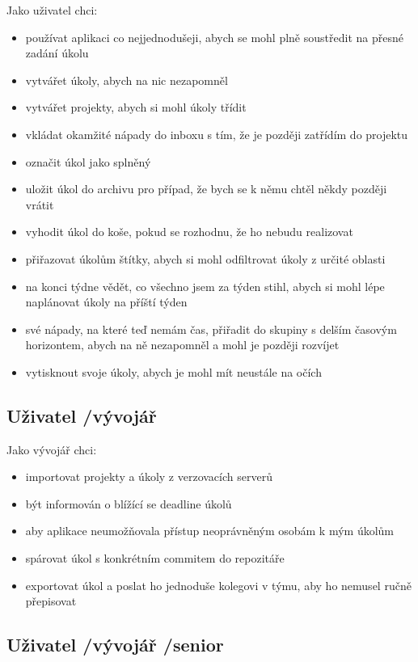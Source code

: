 Jako uživatel chci:

\begin{itemize}
\item používat aplikaci co nejjednodušeji, abych se mohl plně soustředit na přesné zadání úkolu
\item vytvářet úkoly, abych na nic nezapomněl
\item vytvářet projekty, abych si mohl úkoly třídit
\item vkládat okamžité nápady do inboxu s tím, že je později zatřídím do projektu
\item označit úkol jako splněný
\item uložit úkol do archivu pro případ, že bych se k němu chtěl někdy později vrátit
\item vyhodit úkol do koše, pokud se rozhodnu, že ho nebudu realizovat
\item přiřazovat úkolům štítky, abych si mohl odfiltrovat úkoly z určité oblasti
\item na konci týdne vědět, co všechno jsem za týden stihl, abych si mohl lépe naplánovat úkoly na příští týden
\item své nápady, na které teď nemám čas, přiřadit do skupiny s delším časovým horizontem, abych na ně nezapomněl a mohl je později rozvíjet
\item vytisknout svoje úkoly, abych je mohl mít neustále na očích
\end{itemize}

\subsection{Uživatel \slash  vývojář}

Jako vývojář chci:

\begin{itemize}
\item importovat projekty a úkoly z verzovacích serverů
\item být informován o blížící se deadline úkolů
\item aby aplikace neumožňovala přístup neoprávněným osobám k mým úkolům
\item spárovat úkol s konkrétním commitem do repozitáře
\item exportovat úkol a poslat ho jednoduše kolegovi v týmu, aby ho nemusel ručně přepisovat
\end{itemize}

\subsection{Uživatel \slash  vývojář \slash  senior}

